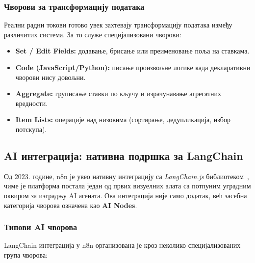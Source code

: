 \subsubsection{Чворови за трансформацију података}

Реални радни токови готово увек захтевају трансформацију података
између различитих система. За то служе специјализовани чворови:

\begin{itemize}
    \item \textbf{Set / Edit Fields:} додавање, брисање или
    преименовање поља на ставкама.
    \item \textbf{Code (JavaScript/Python):} писање произвољне
    логике када декларативни чворови нису довољни.
    \item \textbf{Aggregate:} груписање ставки по кључу и
    израчунавање агрегатних вредности.
    \item \textbf{Item Lists:} операције над низовима
    (сортирање, дедупликација, избор потскупа).
\end{itemize}

\subsection{AI интеграција: нативна подршка за LangChain}

Од 2023. године, n8n је увео нативну интеграцију са
\textit{LangChain.js} библиотеком~\cite{langchain}, чиме је платформа постала
један од првих визуелних алата са потпуним уградним оквиром
за изградњу AI агената. Ова интеграција није само додатак,
већ засебна категорија чворова означена као \textbf{AI Nodes}.

\subsubsection{Типови AI чворова}

LangChain интеграција у n8n организована је кроз неколико
специјализованих група чворова:


